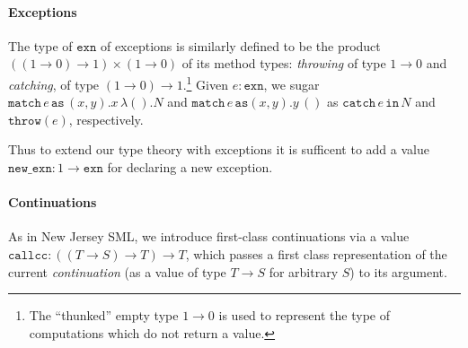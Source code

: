 \documentclass{eptcs}
\newcommand{\as}{{\mathtt{as}}}
\newcommand{\match}{{\mathtt{match}}}
\newcommand{\emp}{{{0}}}
\newcommand{\throw}{{\mathtt{throw}}}
\newcommand{\spc}{\hspace{2pt}}
\newcommand{\callcc}{{\mathtt{callcc}}}
\newcommand{\nxn}{{\mathtt{new\_exn}}}
\newcommand{\catch}{{\mathtt{catch}}}
\newcommand{\com}{{{1}}}
\newcommand{\exn}{{\mathtt{exn}}}
\newcommand{\inn}{{{\mathtt{in}}}}
\begin{document}
\paragraph{Exceptions} The type of $\exn$ of exceptions is similarly defined to be the product  $((\com \rightarrow \emp) \rightarrow \com) \times (\com \rightarrow \emp)$  of its method types: \emph{throwing} of type $\com \rightarrow \emp$ and \emph{catching}, of type $(\com \rightarrow \emp) \rightarrow \com$.\footnote{The ``thunked'' empty type $\com \rightarrow \emp$ is used to represent the type of computations which do not return a value.}  Given $e:\exn$, we sugar  $\match \spc e \spc \as\spc (x,y).x \spc \lambda ().N$  and $\match \spc e\spc \as (x,y).y\spc ()$ as $\catch\spc e\spc \inn \spc N$ and $\throw(e)$, respectively. 

Thus to extend our type theory with exceptions it is sufficent to add a value $\nxn:\com \rightarrow \exn$ for declaring a new exception. 
  
\paragraph{Continuations} As in New Jersey SML, we introduce first-class continuations via a value $\callcc:((T \rightarrow S) \rightarrow T) \rightarrow T$, which passes a first class representation of the current \emph{continuation} (as a value of type $T \rightarrow S$ for arbitrary $S$) to its argument.  
\end{document}
